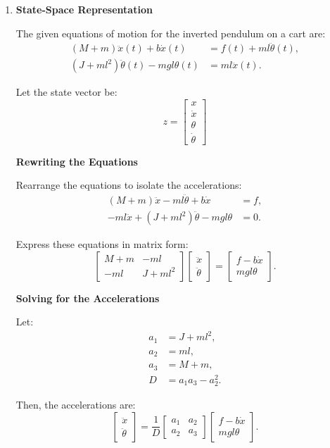 \documentclass[12pt]{article}
\begin{document}
\begin{enumerate}
    \item[(a)] \textbf{State-Space Representation}

    The given equations of motion for the inverted pendulum on a cart are:
    \begin{align*}
    (M + m) \ddot{x}(t) + b \dot{x}(t) &= f(t) + m l \ddot{\theta}(t), \\
    (J + m l^2) \ddot{\theta}(t) - m g l \theta(t) &= m l \ddot{x}(t).
    \end{align*}

    Let the state vector be:
    \[
    z = \begin{bmatrix} x \\ \dot{x} \\ \theta \\ \dot{\theta} \end{bmatrix}
    \]

    \textbf{Rewriting the Equations}

    Rearrange the equations to isolate the accelerations:
    \begin{align*}
    (M + m) \ddot{x} - m l \ddot{\theta} + b \dot{x} &= f, \\
    -m l \ddot{x} + (J + m l^2) \ddot{\theta} - m g l \theta &= 0.
    \end{align*}

    Express these equations in matrix form:
    \[
    \begin{bmatrix}
    M + m & -m l \\
    -m l & J + m l^2
    \end{bmatrix}
    \begin{bmatrix}
    \ddot{x} \\
    \ddot{\theta}
    \end{bmatrix}
    =
    \begin{bmatrix}
    f - b \dot{x} \\
    m g l \theta
    \end{bmatrix}.
    \]

    \textbf{Solving for the Accelerations}

    Let:
    \begin{align*}
    a_1 &= J + m l^2, \\
    a_2 &= m l, \\
    a_3 &= M + m, \\
    D &= a_1 a_3 - a_2^2.
    \end{align*}

    Then, the accelerations are:
    \[
    \begin{bmatrix}
    \ddot{x} \\
    \ddot{\theta}
    \end{bmatrix}
    =
    \frac{1}{D}
    \begin{bmatrix}
    a_1 & a_2 \\
    a_2 & a_3
    \end{bmatrix}
    \begin{bmatrix}
    f - b \dot{x} \\
    m g l \theta
    \end{bmatrix}.
    \]


\end{enumerate}
\end{document}
